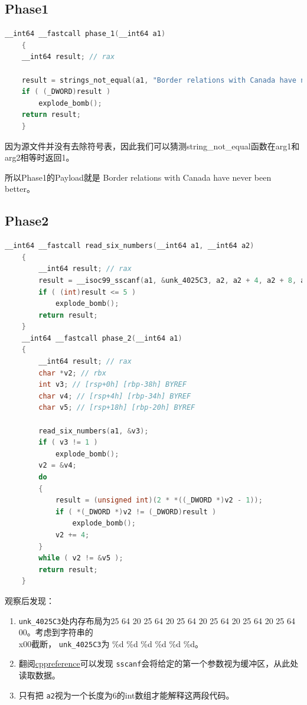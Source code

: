 \documentclass[a4pper,12pt,onecolumn]{article}
\begin{document}
\subsection{Phase1}

\begin{lstlisting}[language=c, caption=Discompile by IDA Pro]
    __int64 __fastcall phase_1(__int64 a1)
    {
    __int64 result; // rax

    result = strings_not_equal(a1, "Border relations with Canada have never been better.");
    if ( (_DWORD)result )
        explode_bomb();
    return result;
    }
\end{lstlisting}

因为源文件并没有去除符号表，因此我们可以猜测string\_not\_equal函数在arg1和arg2相等时返回1。

所以Phase1的Payload就是 Border relations with Canada have never been better。

\subsection{Phase2}

\begin{lstlisting}[language=c, caption=Discompile by IDA Pro]
    __int64 __fastcall read_six_numbers(__int64 a1, __int64 a2)
    {
        __int64 result; // rax
        result = __isoc99_sscanf(a1, &unk_4025C3, a2, a2 + 4, a2 + 8, a2 + 12, a2 + 16, a2 + 20);
        if ( (int)result <= 5 )
            explode_bomb();
        return result;
    }
    __int64 __fastcall phase_2(__int64 a1)
    {
        __int64 result; // rax
        char *v2; // rbx
        int v3; // [rsp+0h] [rbp-38h] BYREF
        char v4; // [rsp+4h] [rbp-34h] BYREF
        char v5; // [rsp+18h] [rbp-20h] BYREF

        read_six_numbers(a1, &v3);
        if ( v3 != 1 )
            explode_bomb();
        v2 = &v4;
        do
        {
            result = (unsigned int)(2 * *((_DWORD *)v2 - 1));
            if ( *(_DWORD *)v2 != (_DWORD)result )
                explode_bomb();
            v2 += 4;
        }
        while ( v2 != &v5 );
        return result;
    }
\end{lstlisting}

观察后发现：

\begin{enumerate}
    \item  \texttt{unk\_4025C3}处内存布局为25 64 20 25 64 20 25 64 20 25 64 20 25 64 20 25 64 00。考虑到字符串的 \\x00截断， \texttt{unk\_4025C3}为 \%d \%d \%d \%d \%d \%d。
    \item 翻阅\href{https://en.cppreference.com/w/c/io/fscanf}{cppreference}可以发现 \texttt{sscanf}会将给定的第一个参数视为缓冲区，从此处读取数据。
    \item 只有把 \texttt{a2}视为一个长度为6的int数组才能解释这两段代码。
\end{enumerate}
\end{document}
